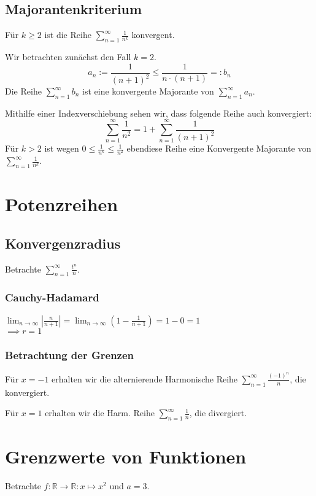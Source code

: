 \documentclass[10pt,a4paper]{article}
\begin{document}
\begin{multicols*}{2}
\subsection*{Majorantenkriterium}
Für $k\ge2$ ist die Reihe $\displaystyle \sum_{n=1}^\infty\frac{1}{n^k}$ konvergent.

Wir betrachten zunächst den Fall $k=2$.
\[a_n := \frac{1}{(n+1)^2} \le \frac{1}{n\cdot(n+1)} =: b_n\]
Die Reihe $\sum_{n=1}^\infty b_n$ ist eine konvergente Majorante von $\sum_{n=1}^\infty a_n$.

Mithilfe einer Indexverschiebung sehen wir, dass folgende Reihe auch konvergiert:
\[\sum_{n=1}^\infty\frac{1}{n^2}=1+\sum_{n=1}^\infty\frac{1}{(n+1)^2}\]
Für $k>2$ ist wegen $0\le\frac{1}{n^k}\le\frac{1}{n^2}$ ebendiese Reihe eine Konvergente Majorante von $\sum_{n=1}^\infty\frac{1}{n^k}$.

\section*{Potenzreihen}
\subsection*{Konvergenzradius}

Betrachte $\displaystyle \sum_{n=1}^\infty\frac{t^n}{n}$.

\subsubsection*{Cauchy-Hadamard}
$\displaystyle \lim_{n\to\infty}\left|\frac{n}{n+1}\right|=\lim_{n\to\infty}\left(1-\frac{1}{n+1}\right)=1-0=1$\\
$\implies r=1$

\subsubsection*{Betrachtung der Grenzen}
Für $x=-1$ erhalten wir die alternierende Harmonische Reihe $\sum_{n=1}^\infty\frac{(-1)^n}{n}$, die konvergiert.

Für $x=1$ erhalten wir die Harm. Reihe $\sum_{n=1}^\infty\frac{1}{n}$, die divergiert.


\section*{Grenzwerte von Funktionen}

Betrachte $f: \mathbb{R}\to\mathbb{R}: x\mapsto x^2$ und $a=3$.


\end{multicols*}
\end{document}
